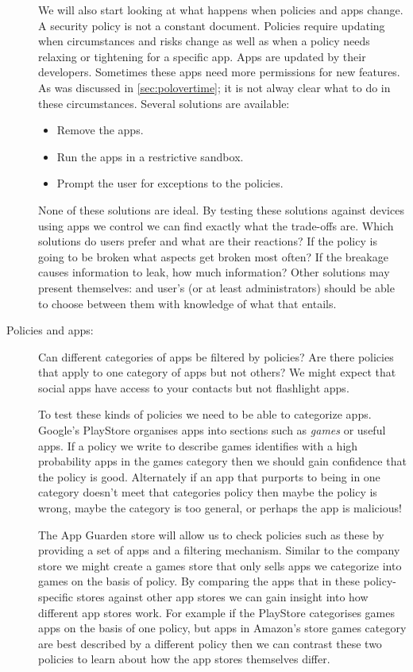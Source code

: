 \documentclass[a4paper,sfsidenotes]{%
  scrartcl%
}
\begin{document}
\begin{description}
    We will also start looking at what happens when policies and apps change.  A security
    policy is not a constant document.  Policies require updating when
    circumstances and risks change as well as when a policy needs relaxing or
    tightening for a specific app. Apps are updated by their developers.
    Sometimes these apps need more permissions for new features.  As was discussed in
    \autoref{sec:polovertime}; it is not alway clear what to do in these
    circumstances. Several solutions are available:

    \begin{itemize}
      \item Remove the apps.
      \item Run the apps in a restrictive sandbox.
      \item Prompt the user for exceptions to the policies.
    \end{itemize}

    None of these solutions are ideal. By testing these solutions against
    devices using apps we control we can find exactly what the trade-offs are.
    Which solutions do users prefer and what are their reactions?  If the policy
    is going to be broken what aspects get broken most often?  If the breakage
    causes information to leak, how much information?  Other solutions may
    present themselves: and user's (or at least administrators) should be able
    to choose between them with knowledge of what that entails.
    
  \item[Policies and apps:] Can different categories of apps be filtered by
    policies?  Are there policies that apply to one category of apps but not
    others?  We might expect that social apps have access to your contacts but
    not flashlight apps.
  
    To test these kinds of policies we need to be able to categorize apps.
    Google's PlayStore organises apps into sections such as \emph{games} or
    useful apps.  If a policy we write to describe games identifies with a high
    probability apps in the games category then we should gain confidence that
    the policy is good.  Alternately if an app that purports to being in one
    category doesn't meet that categories policy then maybe the policy is wrong,
    maybe the category is too general, or perhaps the app is malicious!

    The App Guarden store will allow us to check policies such as these by
    providing a set of apps and a filtering mechanism.  Similar to the company
    store we might create a games store that only sells apps we categorize into
    games on the basis of policy.  By comparing the apps that in these
    policy-specific stores against other app stores we can gain insight into how
    different app stores work.  For example if the PlayStore categorises games
    apps on the basis of one policy, but apps in Amazon's store games category
    are best described by a different policy then we can contrast these two
    policies to learn about how the app stores themselves differ.


\end{description}
\end{document}
